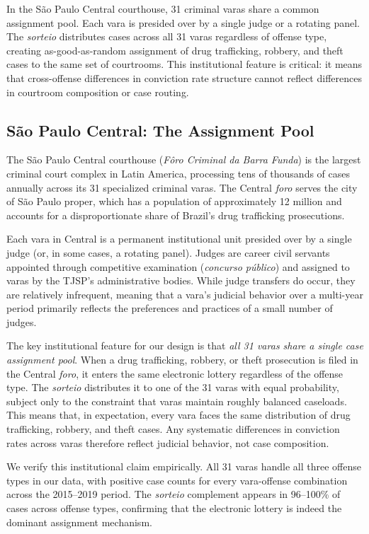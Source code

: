 \documentclass[12pt]{article}
\begin{document}
In the S\~ao Paulo Central courthouse, 31 criminal varas share a common assignment pool. Each vara is presided over by a single judge or a rotating panel. The \textit{sorteio} distributes cases across all 31 varas regardless of offense type, creating as-good-as-random assignment of drug trafficking, robbery, and theft cases to the same set of courtrooms. This institutional feature is critical: it means that cross-offense differences in conviction rate structure cannot reflect differences in courtroom composition or case routing.

\subsection{S\~ao Paulo Central: The Assignment Pool}

The S\~ao Paulo Central courthouse (\textit{F\^oro Criminal da Barra Funda}) is the largest criminal court complex in Latin America, processing tens of thousands of cases annually across its 31 specialized criminal varas. The Central \textit{foro} serves the city of S\~ao Paulo proper, which has a population of approximately 12 million and accounts for a disproportionate share of Brazil's drug trafficking prosecutions.

Each vara in Central is a permanent institutional unit presided over by a single judge (or, in some cases, a rotating panel). Judges are career civil servants appointed through competitive examination (\textit{concurso p\'ublico}) and assigned to varas by the TJSP's administrative bodies. While judge transfers do occur, they are relatively infrequent, meaning that a vara's judicial behavior over a multi-year period primarily reflects the preferences and practices of a small number of judges.

The key institutional feature for our design is that \textit{all 31 varas share a single case assignment pool}. When a drug trafficking, robbery, or theft prosecution is filed in the Central \textit{foro}, it enters the same electronic lottery regardless of the offense type. The \textit{sorteio} distributes it to one of the 31 varas with equal probability, subject only to the constraint that varas maintain roughly balanced caseloads. This means that, in expectation, every vara faces the same distribution of drug trafficking, robbery, and theft cases. Any systematic differences in conviction rates across varas therefore reflect judicial behavior, not case composition.

We verify this institutional claim empirically. All 31 varas handle all three offense types in our data, with positive case counts for every vara-offense combination across the 2015--2019 period. The \textit{sorteio} complement appears in 96--100\% of cases across offense types, confirming that the electronic lottery is indeed the dominant assignment mechanism.
\end{document}

